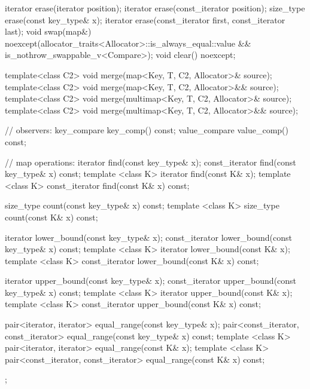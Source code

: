 \begin{codeblock}
{{    iterator  erase(iterator position);
    iterator  erase(const_iterator position);
    size_type erase(const key_type& x);
    iterator  erase(const_iterator first, const_iterator last);
    void      swap(map&)
      noexcept(allocator_traits<Allocator>::is_always_equal::value &&
               is_nothrow_swappable_v<Compare>);
    void      clear() noexcept;

    template<class C2>
      void merge(map<Key, T, C2, Allocator>& source);
    template<class C2>
      void merge(map<Key, T, C2, Allocator>&& source);
    template<class C2>
      void merge(multimap<Key, T, C2, Allocator>& source);
    template<class C2>
      void merge(multimap<Key, T, C2, Allocator>&& source);

    // observers:
    key_compare key_comp() const;
    value_compare value_comp() const;

    // map operations:
    iterator       find(const key_type& x);
    const_iterator find(const key_type& x) const;
    template <class K> iterator       find(const K& x);
    template <class K> const_iterator find(const K& x) const;

    size_type      count(const key_type& x) const;
    template <class K> size_type count(const K& x) const;

    iterator       lower_bound(const key_type& x);
    const_iterator lower_bound(const key_type& x) const;
    template <class K> iterator       lower_bound(const K& x);
    template <class K> const_iterator lower_bound(const K& x) const;

    iterator       upper_bound(const key_type& x);
    const_iterator upper_bound(const key_type& x) const;
    template <class K> iterator       upper_bound(const K& x);
    template <class K> const_iterator upper_bound(const K& x) const;

    pair<iterator, iterator>               equal_range(const key_type& x);
    pair<const_iterator, const_iterator>   equal_range(const key_type& x) const;
    template <class K>
      pair<iterator, iterator>             equal_range(const K& x);
    template <class K>
      pair<const_iterator, const_iterator> equal_range(const K& x) const;
  };

}
\end{codeblock}
